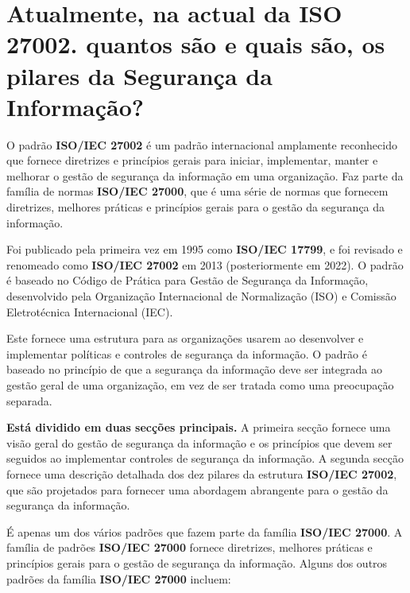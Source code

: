\section[Pergunta 2]{Atualmente, na actual da \textbf{ISO 27002}. quantos são e quais são, os pilares da Segurança da Informação?}

O padrão \textbf{\textbf{ISO/IEC 27002}} é um padrão internacional amplamente reconhecido que fornece diretrizes e princípios gerais para iniciar, implementar, manter e melhorar o gestão de segurança da informação em uma organização. Faz parte da família de normas \textbf{ISO/IEC 27000}, que é uma série de normas que fornecem diretrizes, melhores práticas e princípios gerais para o gestão da segurança da informação.

Foi publicado pela primeira vez em 1995 como \textbf{ISO/IEC 17799}, e foi revisado e renomeado como \textbf{ISO/IEC 27002} em 2013 (posteriormente em 2022). O padrão é baseado no Código de Prática para Gestão de Segurança da Informação, desenvolvido pela Organização Internacional de Normalização (ISO) e Comissão Eletrotécnica Internacional (IEC).

Este fornece uma estrutura para as organizações usarem ao desenvolver e implementar políticas e controles de segurança da informação. O padrão é baseado no princípio de que a segurança da informação deve ser integrada ao gestão geral de uma organização, em vez de ser tratada como uma preocupação separada.

\textbf{Está dividido em duas secções principais.} A primeira secção fornece uma visão geral do gestão de segurança da informação e os princípios que devem ser seguidos ao implementar controles de segurança da informação. A segunda secção fornece uma descrição detalhada dos dez pilares da estrutura \textbf{ISO/IEC 27002}, que são projetados para fornecer uma abordagem abrangente para o gestão da segurança da informação.

É apenas um dos vários padrões que fazem parte da família \textbf{ISO/IEC 27000}. A família de padrões \textbf{ISO/IEC 27000} fornece diretrizes, melhores práticas e princípios gerais para o gestão de segurança da informação. Alguns dos outros padrões da família \textbf{ISO/IEC 27000} incluem:

